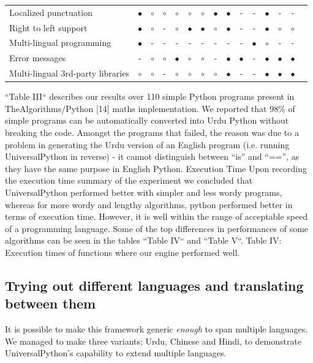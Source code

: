 \documentclass[conference]{IEEEtran}
\begin{document}
\begin{table}[t]
\begin{tabularx}{\textwidth}{l *{14}{c}}
    Localized punctuation & $\bullet$ & $\circ$ & $\circ$ & $\circ$ & $\circ$ & $\circ$ & $\bullet$ & $\bullet$ & - & - & $\bullet$ & - & - \\
    Right to left support & $\bullet$ & $\circ$ & - & $\circ$ & $\bullet$ & $\bullet$ & $\circ$ & $\bullet$ & - & - & $\bullet$ & $\circ$ & $\circ$ \\
    Multi-lingual programming & $\bullet$ & - & - & - & - & - & - & - & - & $\bullet$ & $\circ$ & - & - \\
    Error messages & - & $\circ$ & $\circ$ & $\bullet$ & $\circ$ & $\circ$ & - & $\bullet$ & $\bullet$ & - & $\bullet$ & $\bullet$ & $\bullet$ \\
    Multi-lingual 3rd-party libraries & $\circ$ & $\circ$ & - & $\circ$ & $\circ$ & $\circ$ & $\circ$ & $\bullet$ & - & - & $\bullet$ & $\bullet$ & $\bullet$ \\
    \hline
    \end{tabularx}
    \end{table}
    

“Table III“ describes our results over 110 simple Python programs present in TheAlgorithms/Python [14] maths implementation.
We reported that 98\% of simple programs can be automatically converted into Urdu Python without breaking the code. Amongst the programs that failed, the reason was due to a problem in generating the Urdu version of an English program (i.e. running UniversalPython in reverse) - it cannot distinguish between “is” and “==”, as they have the same purpose in English Python.
Execution Time Upon recording the execution time summary of the experiment we concluded that UniversalPython performed better with simpler and less wordy programs, whereas for more wordy and lengthy algorithms, python performed better in terms of execution time. However, it is well within the range of acceptable speed of a programming language. Some of the top differences in performances of some algorithms can be seen in the tables “Table IV“ and “Table V“.
Table IV: Execution times of functions where our engine performed well.

\subsection{Trying out different languages and translating between them}

It is possible to make this framework generic \textit{enough} to span multiple languages. We managed to make three variants; Urdu, Chinese and Hindi, to demonstrate UniversalPython's capability to extend multiple languages.
\end{document}

